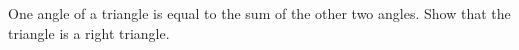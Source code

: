 One angle of a triangle is equal to the sum of the other two angles. Show that the triangle is a right triangle.

